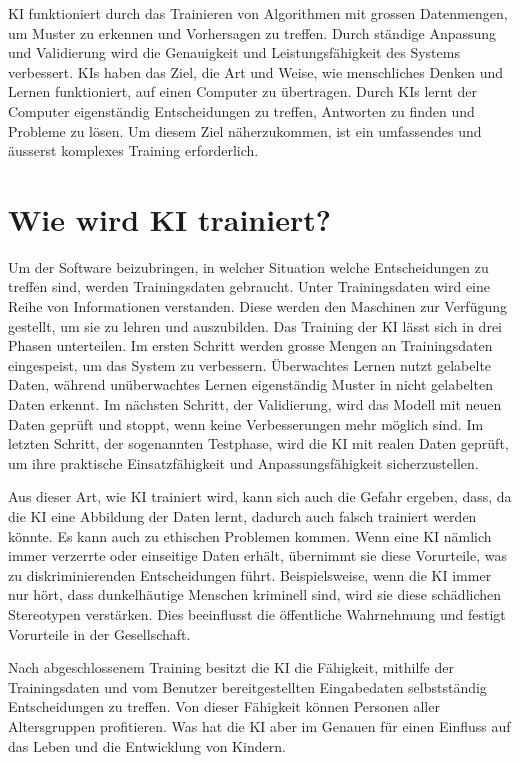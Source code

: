 \documentclass{report}
\begin{document}
KI funktioniert durch das Trainieren von Algorithmen mit grossen Datenmengen, um Muster zu erkennen und Vorhersagen zu treffen. Durch ständige Anpassung und Validierung wird die Genauigkeit und Leistungsfähigkeit des Systems verbessert. KIs haben das Ziel, die Art und Weise, wie menschliches Denken und Lernen funktioniert, auf einen Computer zu übertragen. Durch KIs lernt der Computer eigenständig Entscheidungen zu treffen, Antworten zu finden und Probleme zu lösen. Um diesem Ziel näherzukommen, ist ein umfassendes und äusserst komplexes Training erforderlich.

\section{Wie wird KI trainiert?}

Um der Software beizubringen, in welcher Situation welche Entscheidungen zu treffen sind, werden Trainingsdaten gebraucht. Unter Trainingsdaten wird eine Reihe von Informationen verstanden. Diese werden den Maschinen zur Verfügung gestellt, um sie zu lehren und auszubilden. 
Das Training der KI lässt sich in drei Phasen unterteilen. Im ersten Schritt werden grosse Mengen an Trainingsdaten eingespeist, um das System zu verbessern. Überwachtes Lernen nutzt gelabelte Daten, während unüberwachtes Lernen eigenständig Muster in nicht gelabelten Daten erkennt.
Im nächsten Schritt, der Validierung, wird das Modell mit neuen Daten geprüft und stoppt, wenn keine Verbesserungen mehr möglich sind. Im letzten Schritt, der sogenannten Testphase, wird die KI mit realen Daten geprüft, um ihre praktische Einsatzfähigkeit und Anpassungsfähigkeit sicherzustellen.

Aus dieser Art, wie KI trainiert wird, kann sich auch die Gefahr ergeben, dass, da die KI eine Abbildung der Daten lernt, dadurch auch falsch trainiert werden könnte. Es kann auch zu ethischen Problemen kommen.
Wenn eine KI nämlich immer verzerrte oder einseitige Daten erhält, übernimmt sie diese Vorurteile, was zu diskriminierenden Entscheidungen führt. Beispielsweise, wenn die KI immer nur hört, dass dunkelhäutige Menschen kriminell sind, wird sie diese schädlichen Stereotypen verstärken. Dies beeinflusst die öffentliche Wahrnehmung und festigt Vorurteile in der Gesellschaft.

Nach abgeschlossenem Training besitzt die KI die Fähigkeit, mithilfe der Trainingsdaten und vom Benutzer bereitgestellten Eingabedaten selbstständig Entscheidungen zu treffen. Von dieser Fähigkeit können Personen aller Altersgruppen profitieren. Was hat die KI aber im Genauen für einen Einfluss auf das Leben und die Entwicklung von Kindern.
\end{document}
